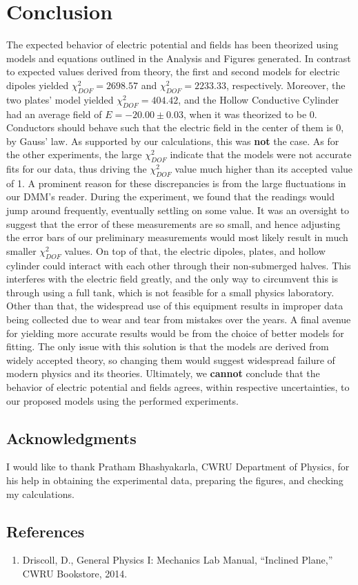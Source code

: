 \documentclass[12pt]{article}
\begin{document}
\newpage

\section{Conclusion}
The expected behavior of electric potential and fields has been theorized using models and equations outlined in the Analysis and Figures generated. In contrast to expected values derived from theory, the first and second models for electric dipoles yielded $\chi^2_{DOF}=2698.57$ and $\chi^2_{DOF}=2233.33$, respectively. Moreover, the two plates' model yielded $\chi^2_{DOF}=404.42$, and the Hollow Conductive Cylinder had an average field of $E=-20.00\pm0.03$, when it was theorized to be 0. Conductors should behave such that the electric field in the center of them is 0, by Gauss' law. As supported by our calculations, this was \textbf{not} the case. As for the other experiments, the large $\chi^2_{DOF}$ indicate that the models were not accurate fits for our data, thus driving the $\chi^2_{DOF}$ value much higher than its accepted value of 1. A prominent reason for these discrepancies is from the large fluctuations in our DMM's reader. During the experiment, we found that the readings would jump around frequently, eventually settling on some value. It was an oversight to suggest that the error of these measurements are so small, and hence adjusting the error bars of our preliminary measurements would most likely result in much smaller $\chi^2_{DOF}$ values. On top of that, the electric dipoles, plates, and hollow cylinder could interact with each other through their non-submerged halves. This interferes with the electric field greatly, and the only way to circumvent this is through using a full tank, which is not feasible for a small physics laboratory. Other than that, the widespread use of this equipment results in improper data being collected due to wear and tear from mistakes over the years. A final avenue for yielding more accurate results would be from the choice of better models for fitting. The only issue with this solution is that the models are derived from widely accepted theory, so changing them would suggest widespread failure of modern physics and its theories. Ultimately, we \textbf{cannot} conclude that the behavior of electric potential and fields agrees, within respective uncertainties, to our proposed models using the performed experiments.

\subsection{Acknowledgments}
I would like to thank Pratham Bhashyakarla, CWRU Department of Physics, for his help in obtaining the experimental data, preparing the figures, and checking my calculations.

\subsection{References}
\begin{enumerate}
    \item Driscoll, D., General Physics I: Mechanics Lab Manual, “Inclined Plane,” CWRU Bookstore, 2014.
\end{enumerate}
\end{document}
